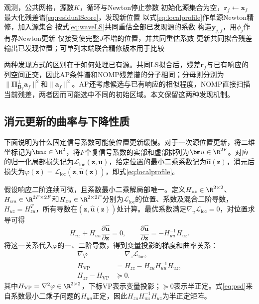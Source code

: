 \begin{algorithm}[H]
\caption{波形消元块NOMP}\label{alg:nomp}
\begin{algorithmic}[1]
\Require 观测，公共网格，源数$K$，循环与Newton停止参数
\State 初始化源集合为空，$\bm r_f\gets\bm x_f$
  \State 最大化残差谱\eqref{eq:residualScore}，发现新位置
  \State 以式\eqref{eq:localprofile}作单源Newton精修，加入源集合
  \State 按式\eqref{eq:waveLS}共同重估全部已发现源的系数
  \Repeat
      \State 构造$\bm y_{j,f}$，用$\phi_j$作有界Newton更新
      \State 仅接受使完整$J$不增的位置，并共同重估系数
    \EndFor
  \State 更新共同拟合残差
\EndFor
\State 输出已发现位置；可单列末端联合精修版本用于比较
\end{algorithmic}
\end{algorithm}

两种发现方式的区别在于如何处理已有源。共同LS拟合后，残差$\bm r_f$与已有响应的列空间正交，因此AP条件谱和NOMP残差谱的分子相同；分母则分别为$\|\bm\Pi_{\bm B_f}^{\perp}\bm a_f\|^2$和$\|\bm a_f\|^2$。AP还考虑候选与已有响应的相似程度，NOMP直接扫描当前残差，两者因而可能选中不同的初始区域。本文保留这两种发现机制。

\subsection{消元更新的曲率与下降性质}\label{sec:curvature}
下面说明为什么固定信号系数可能使位置更新缓慢。对于一次源位置更新，将二维坐标记为$\bm z\in\R^2$，将$F$个复信号系数的实部和虚部排列为$\bm u\in\R^{2F}$。对应的归一化局部损失记为$\mathcal L_{\mathrm{loc}}(\bm z,\bm u)$，给定位置的最小二乘系数记为$\widehat{\bm u}(\bm z)$，消元后损失为$\varphi(\bm z)=\mathcal L_{\mathrm{loc}}(\bm z,\widehat{\bm u}(\bm z))$，即式\eqref{eq:localprofile}。

假设响应二阶连续可微，且系数最小二乘解局部唯一。定义$H_{zz}\in\R^{2\times2}$、$H_{uu}\in\R^{2F\times2F}$和$H_{zu}\in\R^{2\times2F}$分别为$\mathcal L_{\mathrm{loc}}$的位置、系数及混合二阶导数，$H_{uz}=H_{zu}^T$，所有导数在$(\bm z,\widehat{\bm u}(\bm z))$处计算。最优系数满足$\nabla_u\mathcal L_{\mathrm{loc}}=0$，对位置求导可得
\begin{equation}
 H_{uz}+H_{uu}\frac{\partial\widehat{\bm u}}{\partial\bm z}=0,
 \qquad\frac{\partial\widehat{\bm u}}{\partial\bm z}
 =-H_{uu}^{-1}H_{uz}.\label{eq:coefficientDerivative}
\end{equation}
将这一关系代入$\varphi$的一、二阶导数，得到变量投影的梯度和曲率关系\cite{GolubPereyra1973}：
\begin{align}
 \nabla\varphi&=\nabla_z\mathcal L_{\mathrm{loc}},\label{eq:envelope}\\
 H_{\mathrm{VP}}&=H_{zz}-H_{zu}H_{uu}^{-1}H_{uz},\label{eq:schur}\\
 H_{zz}-H_{\mathrm{VP}}&\succeq0 .\label{eq:psd}
\end{align}
其中$H_{\mathrm{VP}}=\nabla^2\varphi\in\R^{2\times2}$，下标VP表示变量投影；$\succeq0$表示半正定。式\eqref{eq:psd}来自系数最小二乘子问题的$H_{uu}$正定，因此$H_{zu}H_{uu}^{-1}H_{uz}$为半正定矩阵。

